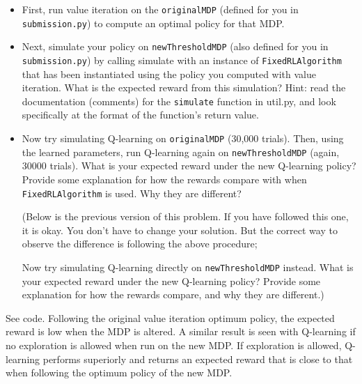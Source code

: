 \documentclass[10pt]{article}
\begin{document}
\begin{enumerate}[label=(\alph*)]
	\begin{itemize}
		\item First, run value iteration on the \texttt{originalMDP} (defined for you in \texttt{submission.py}) to compute an optimal policy for that MDP.
		\item Next, simulate your policy on \texttt{newThresholdMDP} (also defined for you in \texttt{submission.py}) by calling simulate with an instance of \texttt{FixedRLAlgorithm} that has been instantiated using the policy you computed with value iteration. What is the expected reward from this simulation? Hint: read the documentation (comments) for the \texttt{simulate} function in util.py, and look specifically at the format of the function's return value.
		\item Now try simulating Q-learning on \texttt{originalMDP} (30,000 trials). Then, using the learned parameters, run Q-learning again on \texttt{newThresholdMDP} (again, 30000 trials). What is your expected reward under the new Q-learning policy? Provide some explanation for how the rewards compare with when \texttt{FixedRLAlgorithm} is used. Why they are different?
		
		(Below is the previous version of this problem. If you have followed this one, it is okay. You don't have to change your solution. But the correct way to observe the difference is following the above procedure;

		Now try simulating Q-learning directly on \texttt{newThresholdMDP} instead. What is your expected reward under the new Q-learning policy? Provide some explanation for how the rewards compare, and why they are different.) 
	\end{itemize}
	
	See code. Following the original value iteration optimum policy, the expected reward is low when the MDP is altered. A similar result is seen with Q-learning if no exploration is allowed when run on the new MDP. If exploration is allowed, Q-learning performs superiorly and returns an expected reward that is close to that when following the optimum policy of the new MDP.
		
\end{enumerate}
\fi
\end{document}
